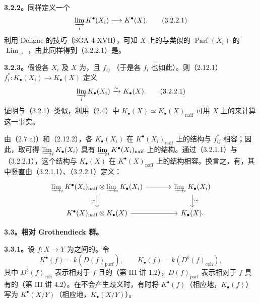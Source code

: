 \textbf{3.2.2。}同样定义一个
\[\varinjlim_i K^\bullet(X_i)\longrightarrow K^\bullet(X).\tag{3.2.2.1}\]
利用 Deligne 的技巧（SGA 4 XVII），可知 $X$ 上的与类似的 $\operatorname{Parf}(X_i)$ 的 $\operatorname*{Lim}_{\longrightarrow}$ ，由此同样得到（3.2.2.1）是。

\textbf{3.2.3。}假设各 $X_i$ 及 $X$ 为，且 $f_{ij}$ （于是各 $f_i$ 也如此）。则（2.12.1）$f_i^*:K_\bullet(X_i)\to K_\bullet(X)$ 定义
\[\varinjlim_i K_\bullet(X_i)\xrightarrow{\sim}K_\bullet(X).\tag{3.2.2.1}\]
证明与（3.2.1）类似，利用（2.4）中 $K_\bullet(X)\simeq K_\bullet(X)_{\text{naïf}}$ 可用 $X$ 上的来计算这一事实。

由（2.7 a)）和（2.12.2），各 $K_\bullet(X_i)$ 在 $K^\bullet(X_i)_{\text{naïf}}$ 上的结构与 $f_{ij}^*$ 相容；因此，取可得 $\varinjlim_i K_\bullet(X_i)$ 具有 $\varinjlim_i K^\bullet(X_i)_{\text{naïf}}$ 上的结构。通过（3.2.1.1）与（3.2.2.1），这个结构与 $K_\bullet(X)$ 在 $K^\bullet(X)_{\text{naïf}}$ 上的结构相容。换言之，有，其中竖直由（3.2.1.1）、（3.2.2.1）定义：
\[\begin{tikzcd}[column sep=large]
\varinjlim_i K^\bullet(X_i)_{\text{naïf}}\otimes\varinjlim_i K_\bullet(X_i)\arrow[r]\arrow[d,"\simeq"']&\varinjlim_i K_\bullet(X_i)\arrow[d,"\simeq"]\\
K^\bullet(X)_{\text{naïf}}\otimes K_\bullet(X)\arrow[r]&K_\bullet(X).
\end{tikzcd}\]

\textbf{3.3。相对 Grothendieck 群。}

\textbf{3.3.1。}设 $f:X\to Y$ 为之间的。令
\[K^\bullet(f)=k(D(f)_{\mathrm{parf}}),\qquad K_\bullet(f)=k(D^b(f)_{\mathrm{coh}}),\]
其中 $D^b(f)_{\mathrm{coh}}$ 表示相对于 $f$ 且的（第 III 讲 1.2），$D(f)_{\mathrm{parf}}$ 表示相对于 $f$ 具有的（第 III 讲 4.2）。在不会产生歧义时，有时将 $K^\bullet(f)$（相应地，$K_\bullet(f)$）写为 $K^\bullet(X/Y)$（相应地，$K_\bullet(X/Y)$）。

